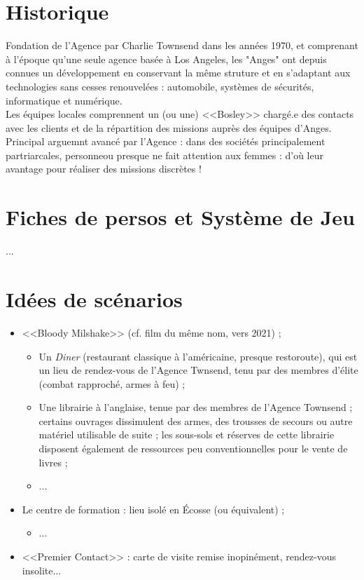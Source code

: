 \documentclass[11pt,twoside,a5paper]{book}
\begin{document}
	\vfill
	
\clearpage

\section{Historique}

Fondation de l'Agence par Charlie Townsend dans les années 1970, et comprenant à l'époque qu'une seule agence basée à Los Angeles, les "Anges" ont depuis connues un développement en conservant la même struture et en s'adaptant aux technologies sans cesses renouvelées : automobile, systèmes de sécurités, informatique et numérique.~\\

Les équipes locales comprennent un (ou une) <<Bosley>> chargé.e des contacts avec les clients et de la répartition des missions auprès des équipes d'Anges. Principal arguemnt avancé par l'Agence : dans des sociétés principalement partriarcales, personneou presque ne fait attention aux femmes : d'où leur avantage pour réaliser des missions discrètes !~\\

\section{Fiches de persos et Système de Jeu}

...

\section{Id{\'e}es de sc{\'e}narios}

\begin{itemize}
	\item <<Bloody Milshake>> (cf. film du m{\^e}me nom, vers 2021) ; 
	\begin{itemize}
		\item Un \emph{Diner} (restaurant classique {\`a} l'am{\'e}ricaine, presque restoroute), qui est un lieu de rendez-vous de l'Agence Twnsend, tenu par des membres d'{\'e}lite (combat rapproch{\'e}, armes {\`a} feu) ; 
		\item Une librairie {\`a} l'anglaise, tenue par des membres de l'Agence Townsend ; certains ouvrages dissimulent des armes, des trousses de secours ou autre mat{\'e}riel utilisable de suite ; les sous-sols et r{\'e}serves de cette librairie disposent {\'e}galement de ressources peu conventionnelles pour le vente de livres ;
		\item ...  
	\end{itemize}
	\item Le centre de formation : lieu isol{\'e} en {\'E}cosse (ou {\'e}quivalent) ; 
	\begin{itemize}
		\item ...  
	\end{itemize}
	\item <<Premier Contact>> : carte de visite remise inopin{\'e}ment, rendez-vous insolite... 
\end{itemize}
\end{document}
